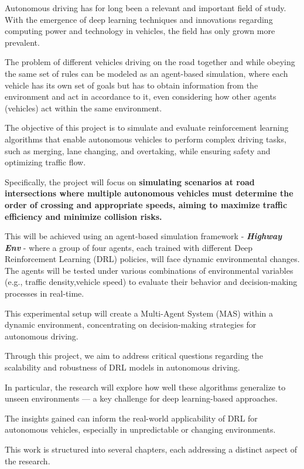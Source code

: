Autonomous driving has for long been a relevant and important field of study. With the emergence of deep learning techniques and innovations regarding computing power and technology in vehicles, the field has only grown more prevalent.

The problem of different vehicles driving on the road together and while obeying the same set of rules can be modeled as an agent-based simulation, where each vehicle has its own set of goals but has to obtain information from the environment and act in accordance to it, 
even considering how other agents (vehicles) act within the same environment.

The objective of this project is to simulate and evaluate reinforcement learning algorithms that enable autonomous vehicles to perform complex driving tasks,
such as merging, lane changing, and overtaking, while ensuring safety and optimizing traffic flow.

Specifically, the project will focus on \textbf{simulating scenarios at road intersections where multiple autonomous vehicles must determine the order of crossing
and appropriate speeds, aiming to maximize traffic efficiency and minimize collision risks.}

This will be achieved using an agent-based simulation framework - \textbf{\textit{Highway Env}}\cite{highwayenv} - where a group of four agents, each trained with different Deep Reinforcement Learning (DRL) policies, will face dynamic environmental changes. The agents will
be tested under various combinations of environmental variables (e.g., traffic density,vehicle speed) to evaluate their behavior and decision-making processes in real-time. 

This experimental setup will create a Multi-Agent System (MAS) within a dynamic environment, concentrating on decision-making strategies for autonomous driving.

Through this project, we aim to address critical questions regarding the scalability and robustness of DRL models in autonomous driving. 

In particular, the research will explore how well these algorithms generalize to unseen environments — a key challenge for deep learning-based approaches. 

The insights gained can inform the real-world applicability of DRL for autonomous vehicles, especially in unpredictable or changing environments.

This work is structured into several chapters, each addressing a distinct aspect of the research. 

